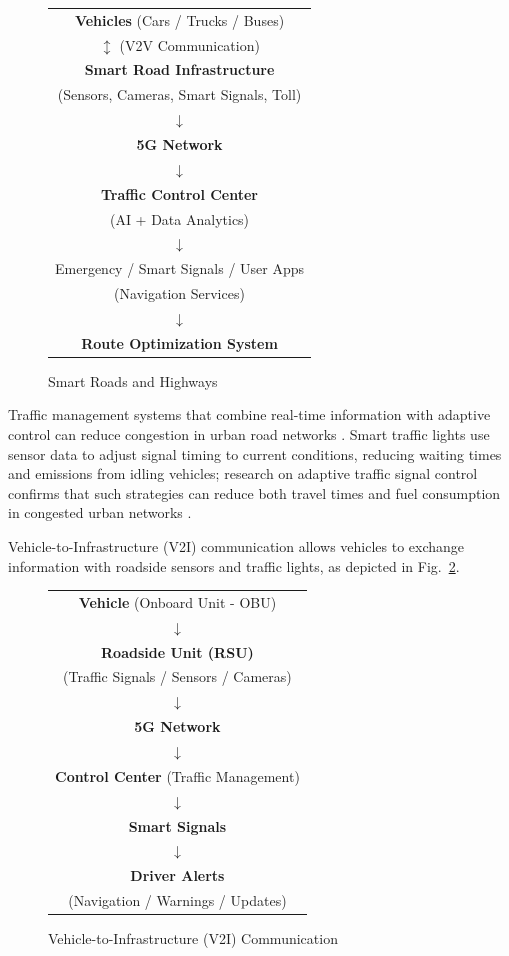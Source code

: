 \documentclass[journal]{IEEEtran}
\begin{document}
\begin{figure}[ht]
\centering
\begin{tabular}{@{}c@{}}
{\textbf{Vehicles}} (Cars / Trucks / Buses)\\
$\updownarrow$ (V2V Communication)\\
\textbf{Smart Road Infrastructure}\\
(Sensors, Cameras, Smart Signals, Toll)\\
$\downarrow$\\
\textbf{5G Network}\\
$\downarrow$\\
{\textbf{Traffic Control Center}}\\
(AI + Data Analytics)\\
$\downarrow$\\
Emergency / Smart Signals / User Apps\\
(Navigation Services)\\
$\downarrow$\\
{\textbf{Route Optimization System}}
\end{tabular}
\caption{Smart Roads and Highways}
\label{fig:roads}
\end{figure}

Traffic management systems that combine real-time information with adaptive control can reduce congestion in urban road networks \cite{r48}. Smart traffic lights use sensor data to adjust signal timing to current conditions, reducing waiting times and emissions from idling vehicles; research on adaptive traffic signal control confirms that such strategies can reduce both travel times and fuel consumption in congested urban networks \cite{r49}.

Vehicle-to-Infrastructure (V2I) communication allows vehicles to exchange information with roadside sensors and traffic lights, as depicted in Fig.~\ref{fig:v2i}.

\begin{figure}[ht]
\centering
\begin{tabular}{@{}c@{}}
{\textbf{Vehicle}} (Onboard Unit - OBU)\\
$\downarrow$\\
\textbf{Roadside Unit (RSU)}\\
(Traffic Signals / Sensors / Cameras)\\
$\downarrow$\\
\textbf{5G Network}\\
$\downarrow$\\
{\textbf{Control Center}} (Traffic Management)\\
$\downarrow$\\
{\textbf{Smart Signals}}\\
$\downarrow$\\
{\textbf{Driver Alerts}}\\
(Navigation / Warnings / Updates)
\end{tabular}
\caption{Vehicle-to-Infrastructure (V2I) Communication}
\label{fig:v2i}
\end{figure}
\end{document}
